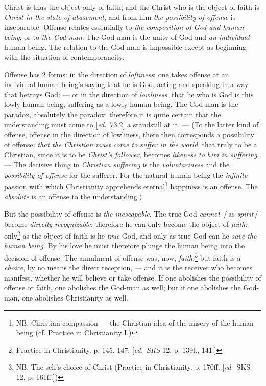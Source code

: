 \documentclass[12pt,a4paper,openany]{book}
\newcommand{\kpage}[1]{\marginnote{\footnotesize\textit{[#1]}}}
\newcommand{\ed}[1]{{\small[\textit{ed.}\ #1]}}
\newcommand{\ins}[1]{\,/\,#1\,/\,}
\begin{document}
Christ is thus the object only of faith, and the Christ who
is the object of faith is \emph{Christ in the state of abasement}, and from him \emph{the possibility
of offense} is inseparable. Offense relates essentially
to \emph{the composition of God and human being}, or to \emph{the God-man}. The God-man
is the unity of God and \emph{an individual} human being. The relation to
the God-man is impossible except as beginning with the situation of
contemporaneity.

Offense has 2 forms: in the direction of \emph{loftiness}; one takes offense
at an individual human being's saying that he is God, acting and speaking
in a way that betrays God; --- or in the direction of \emph{lowliness}: that
he who is God is this lowly human being, suffering as a lowly
human being. The God-man is the paradox, absolutely the paradox;
therefore it is quite certain that the understanding must come to \ed{73.2}
a standstill at it. --- (To the latter kind of offense, offense in
the direction of lowliness, there then corresponds a possibility of offense: \emph{that the
Christian must come to suffer in the world}, that truly to be a Christian,
since it is to be \emph{Christ's follower}, becomes \emph{likeness to him in suffering}. ---
The decisive thing in \emph{Christian suffering} is the \emph{voluntariness} and the \emph{possibility of
offense} for the sufferer. For the natural human being the \emph{infinite}
passion with which Christianity apprehends eternal\footnote[88]{NB. Christian compassion --- the Christian idea of the misery of the
human being (cf. Practice in Christianity I.)}
happiness is an offense. The \emph{absolute} is an offense to the understanding.)

\kpage{154}But the possibility of offense is \emph{the inescapable}. The true God
\emph{cannot} \ins{as \emph{spirit}} become \emph{directly recognizable}; therefore he can only become
the object of \emph{faith}: only\footnote[89]{Practice in Christianity. p. 145. 147. \ed{\emph{SKS} 12, p. 139f., 141.}}
as the object of faith is he \emph{true} God, and
only as true God can he \emph{save the human being}. By his love
he must therefore plunge the human being into the decision of offense. The annulment
of offense was, now, \emph{faith};\footnote[90]{NB. The self's choice of Christ (Practice in Christianity. p. 170ff. \ed{SKS 12, p.
161ff.})}
but faith is a \emph{choice}, by no means
the direct reception, --- and it is the receiver who becomes
manifest, whether he will believe or take offense. If one abolishes the possibility
of offense or faith, one abolishes the God-man as well; but
if one abolishes the God-man, one abolishes Christianity as well.
\end{document}
